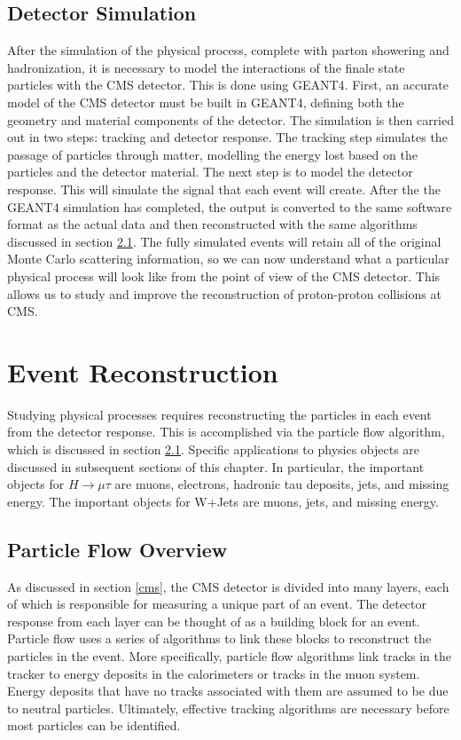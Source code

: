 \documentclass[oneside, letterpaper, oldfontcommands]{memoir}
\begin{document}
\section{Detector Simulation}\label{detectorsim}
\qquad After the simulation of the physical process, complete with parton showering and hadronization, it is necessary to model the interactions of the finale state particles with the CMS detector. This is done using GEANT4\cite{Allison:2006ve}. First, an accurate model of the CMS detector must be built in GEANT4, defining both the geometry and material components of the detector. The simulation is then carried out in two steps: tracking and detector response. The tracking step simulates the passage of particles through matter, modelling the energy lost based on the particles and the detector material. The next step is to model the detector response. This will simulate the signal that each event will create. After the the GEANT4 simulation has completed, the output is converted to the same software format as the actual data and then reconstructed with the same algorithms discussed in section \ref{pflow}. The fully simulated events will retain all of the original Monte Carlo scattering information, so we can now understand what a particular physical process will look like from the point of view of the CMS detector. This allows us to study and improve the reconstruction of proton-proton collisions at CMS.

\chapter{Event Reconstruction}\label{eventreco}

\qquad Studying physical processes requires reconstructing the particles in each event from the detector response. This is accomplished via the particle flow algorithm, which is discussed in section \ref{pflow}. Specific applications to physics objects are discussed in subsequent sections of this chapter. In particular, the important objects for $H \rightarrow \mu\tau$ are muons, electrons, hadronic tau deposits, jets, and missing energy. The important objects for W+Jets are muons, jets, and missing energy.
\section{Particle Flow Overview}\label{pflow}
\qquad As discussed in section \ref{cms}, the CMS detector is divided into many layers, each of which is responsible for measuring a unique part of an event. The detector response from each layer can be thought of as a building block for an event. Particle flow uses a series of algorithms to link these blocks to reconstruct the particles in the event. More specifically, particle flow algorithms link tracks in the tracker to energy deposits in the calorimeters or tracks in the muon system. Energy deposits that have no tracks associated with them are assumed to be due to neutral particles. Ultimately, effective tracking algorithms are necessary before most particles can be identified.
\end{document}
